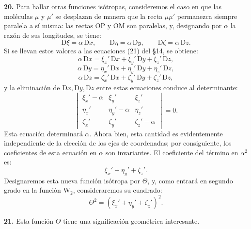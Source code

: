 \noindent\textbf{20.} Para hallar otras funciones isótropas, consideremos
el caso en que las moléculas $\mu$ y $\mu'$ se desplazan de manera que la
recta $\mu\mu'$ permanezca siempre paralela a sí misma: las rectas
$\mathrm{OP}$ y $\mathrm{OM}$ son paralelas, y, designando por $\alpha$ la
razón de sus longitudes, se tiene:
\[
\mathrm{D}\xi=\alpha\,\mathrm{D}x,\qquad \mathrm{D}\eta=\alpha\,\mathrm{D}y,
\qquad \mathrm{D}\zeta=\alpha\,\mathrm{D}z.
\]
Si se llevan estos valores a las ecuaciones (21) del §14, se obtiene:
\[
\alpha\,\mathrm{D}x=\xi_x'\,\mathrm{D}x+\xi_y'\,\mathrm{D}y+\xi_z'\,\mathrm{D}z,
\]
\[
\alpha\,\mathrm{D}y=\eta_x'\,\mathrm{D}x+\eta_y'\,\mathrm{D}y+\eta_z'\,\mathrm{D}z,
\]
\[
\alpha\,\mathrm{D}z=\zeta_x'\,\mathrm{D}x+\zeta_y'\,\mathrm{D}y+\zeta_z'\,\mathrm{D}z,
\]
y la eliminación de $\mathrm{D}x,\mathrm{D}y,\mathrm{D}z$ entre estas
ecuaciones conduce al determinante:
\[
\begin{vmatrix}
\xi_x'-\alpha & \xi_y' & \xi_z'\\
\eta_x' & \eta_y'-\alpha & \eta_z'\\
\zeta_x' & \zeta_y' & \zeta_z'-\alpha
\end{vmatrix}=0.
\]
Esta ecuación determinará $\alpha$. Ahora bien, esta cantidad es
evidentemente independiente de la elección de los ejes de coordenadas; por
consiguiente, los coeficientes de esta ecuación en $\alpha$ son
invariantes. El coeficiente del término en $\alpha^2$ es:
\[
\xi_x'+\eta_y'+\zeta_z'.
\]
Designaremos esta nueva función isótropa por $\Theta$, y, como entrará en
segundo grado en la función $\mathrm{W}_2$, consideraremos su cuadrado:
\begin{equation}
\Theta^2=(\xi_x'+\eta_y'+\zeta_z')^2.
\tag{25}
\end{equation}

\noindent\textbf{21.} Esta función $\Theta$ tiene una significación
geométrica interesante.

